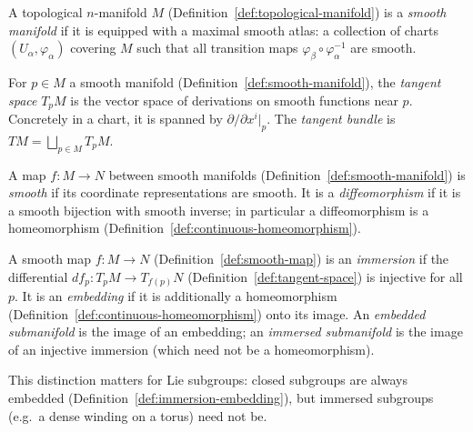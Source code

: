 \begin{definition}
\label{def:smooth-manifold}
A topological $n$-manifold $M$ (Definition~\ref{def:topological-manifold}) is a \emph{smooth manifold} if it is equipped with a maximal smooth atlas: a collection of charts $(U_\alpha, \varphi_\alpha)$ covering $M$ such that all transition maps $\varphi_\beta \circ \varphi_\alpha^{-1}$ are smooth.
\end{definition}

\begin{definition}
\label{def:tangent-space}
For $p \in M$ a smooth manifold (Definition~\ref{def:smooth-manifold}), the \emph{tangent space} $T_pM$ is the vector space of derivations on smooth functions near $p$. Concretely in a chart, it is spanned by $\partial/\partial x^i|_p$. The \emph{tangent bundle} is $TM = \bigsqcup_{p \in M} T_pM$.
\end{definition}

\begin{definition}
\label{def:smooth-map}
A map $f : M \to N$ between smooth manifolds (Definition~\ref{def:smooth-manifold}) is \emph{smooth} if its coordinate representations are smooth.
It is a \emph{diffeomorphism} if it is a smooth bijection with smooth inverse; in particular a diffeomorphism is a homeomorphism (Definition~\ref{def:continuous-homeomorphism}).
\end{definition}

\begin{definition}
\label{def:immersion-embedding}
A smooth map $f : M \to N$ (Definition~\ref{def:smooth-map}) is an \emph{immersion} if the differential $df_p : T_pM \to T_{f(p)}N$ (Definition~\ref{def:tangent-space}) is injective for all $p$.
It is an \emph{embedding} if it is additionally a homeomorphism (Definition~\ref{def:continuous-homeomorphism}) onto its image.
An \emph{embedded submanifold} is the image of an embedding; an \emph{immersed submanifold} is the image of an injective immersion (which need not be a homeomorphism).
\end{definition}

\begin{remark}
\label{rem:immersed-embedded}
This distinction matters for Lie subgroups: closed subgroups are always embedded (Definition~\ref{def:immersion-embedding}), but immersed subgroups (e.g.\ a dense winding on a torus) need not be.
\end{remark}

